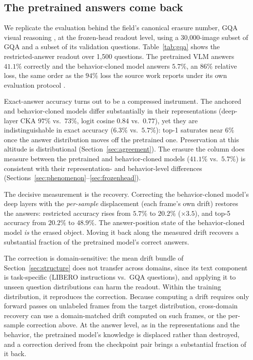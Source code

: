 \documentclass{article}
\begin{document}
\subsection{The pretrained answers come back}
\label{sec:gqa}

We replicate the evaluation behind the field's canonical erasure number, GQA visual
reasoning \cite{hudson2019gqa}, at the frozen-head readout level, using a
30{,}000-image subset of GQA and a subset of its validation questions.
Table~\ref{tab:gqa} shows the restricted-answer readout over 1{,}500 questions. The
pretrained VLM answers $41.1\%$ correctly and the behavior-cloned model answers $5.7\%$,
an $86\%$ relative loss, the same order as the $94\%$ loss the source work reports under
its own evaluation protocol \cite{dalal2026anchoralign}.

Exact-answer accuracy turns out to be a compressed instrument. The anchored and
behavior-cloned models differ substantially in their representations (deep-layer CKA $97\%$
vs.\ $73\%$, logit cosine $0.84$ vs.\ $0.77$), yet they are indistinguishable in exact
accuracy ($6.3\%$ vs.\ $5.7\%$): top-1 saturates near $6\%$ once the answer distribution
moves off the pretrained one. Preservation at this altitude is distributional
(Section~\ref{sec:agreement}). The erasure the column does measure between the pretrained
and behavior-cloned models ($41.1\%$ vs.\ $5.7\%$) is consistent with their representation-
and behavior-level differences (Sections~\ref{sec:phenomenon}--\ref{sec:frozenhead}).

The decisive measurement is the recovery. Correcting the behavior-cloned model's deep layers
with the \emph{per-sample} displacement (each frame's own drift) restores the answers:
restricted accuracy rises from $5.7\%$ to $20.2\%$ ($\times 3.5$), and top-5 accuracy from
$20.2\%$ to $48.9\%$. The answer-position state of the behavior-cloned model \emph{is} the
erased object. Moving it back along the measured drift recovers a substantial fraction of
the pretrained model's correct answers.

The correction is domain-sensitive: the mean drift bundle of Section~\ref{sec:structure}
does not transfer across domains, since its text component is task-specific (LIBERO
instructions vs.\ GQA questions), and applying it to unseen question distributions can harm
the readout. Within the training distribution, it reproduces the correction. Because
computing a drift requires only forward passes on unlabeled frames from the target
distribution, cross-domain recovery can use a domain-matched drift computed on such frames,
or the per-sample correction above. At the answer level, as in the representations and the
behavior, the pretrained model's knowledge is displaced rather than destroyed, and a
correction derived from the checkpoint pair brings a substantial fraction of it back.
\end{document}

